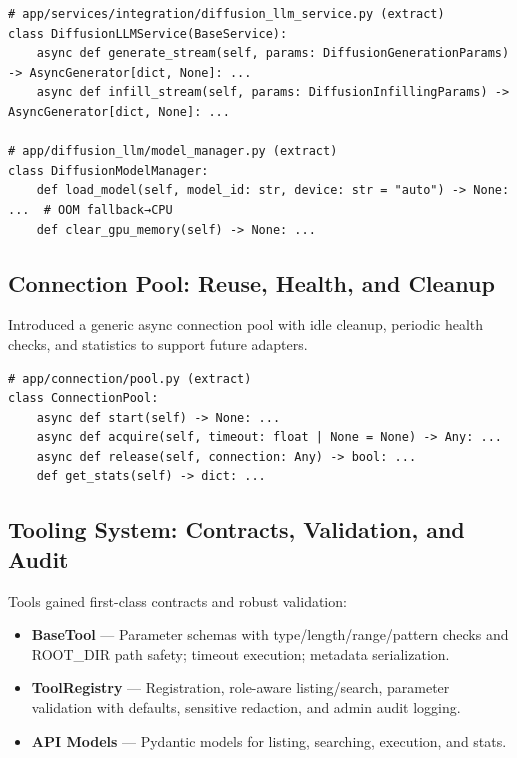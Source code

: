 \documentclass[11pt]{article}
\begin{document}
\begin{lstlisting}[style=python]
# app/services/integration/diffusion_llm_service.py (extract)
class DiffusionLLMService(BaseService):
    async def generate_stream(self, params: DiffusionGenerationParams) -> AsyncGenerator[dict, None]: ...
    async def infill_stream(self, params: DiffusionInfillingParams) -> AsyncGenerator[dict, None]: ...

# app/diffusion_llm/model_manager.py (extract)
class DiffusionModelManager:
    def load_model(self, model_id: str, device: str = "auto") -> None: ...  # OOM fallback→CPU
    def clear_gpu_memory(self) -> None: ...
\end{lstlisting}

\subsection{Connection Pool: Reuse, Health, and Cleanup}

Introduced a generic async connection pool with idle cleanup, periodic health checks, and statistics to support future adapters.

\begin{lstlisting}[style=python]
# app/connection/pool.py (extract)
class ConnectionPool:
    async def start(self) -> None: ...
    async def acquire(self, timeout: float | None = None) -> Any: ...
    async def release(self, connection: Any) -> bool: ...
    def get_stats(self) -> dict: ...
\end{lstlisting}

\subsection{Tooling System: Contracts, Validation, and Audit}

Tools gained first-class contracts and robust validation:

\begin{itemize}
  \item \textbf{BaseTool} — Parameter schemas with type/length/range/pattern checks and ROOT\_DIR path safety; timeout execution; metadata serialization.
  \item \textbf{ToolRegistry} — Registration, role-aware listing/search, parameter validation with defaults, sensitive redaction, and admin audit logging.
  \item \textbf{API Models} — Pydantic models for listing, searching, execution, and stats.
\end{itemize}
\end{document}
